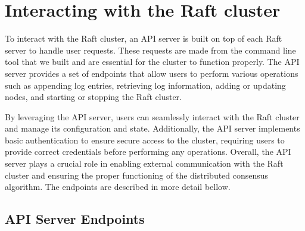\documentclass{article}
\begin{document}
\section{Interacting with the Raft cluster}
To interact with the Raft cluster, an API server is built on top of each Raft server to handle user requests. These requests are made from the command line tool that we built and are essential for the cluster to function properly. The API server provides a set of endpoints that allow users to perform various operations such as appending log entries, retrieving log information, adding or updating nodes, and starting or stopping the Raft cluster. 

By leveraging the API server, users can seamlessly interact with the Raft cluster and manage its configuration and state. Additionally, the API server implements basic authentication to ensure secure access to the cluster, requiring users to provide correct credentials before performing any operations. Overall, the API server plays a crucial role in enabling external communication with the Raft cluster and ensuring the proper functioning of the distributed consensus algorithm. The endpoints are described in more detail bellow.

\subsection{API Server Endpoints}
\end{document}
